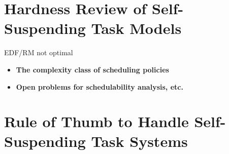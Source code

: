 \section{Hardness Review of Self-Suspending Task Models}
   EDF/RM not optimal \cite{Ridouard_2004} 
   
\begin{itemize}
\item \textbf{The complexity class of scheduling policies}
\item \textbf{Open problems for schedulability analysis, etc.}
\end{itemize}
  
\section{Rule of Thumb to Handle Self-Suspending Task Systems}